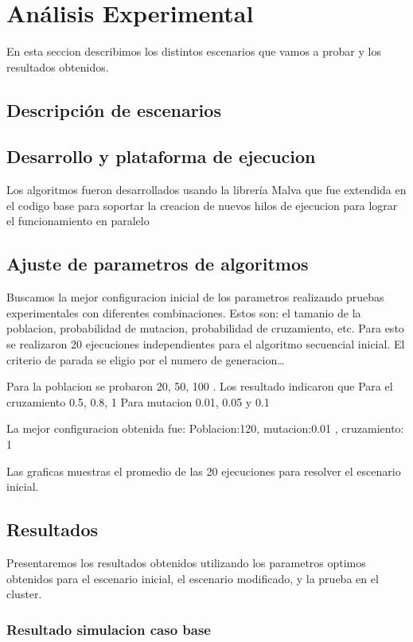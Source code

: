 \chapter{Análisis Experimental}
En esta seccion describimos los distintos escenarios que vamos a probar y los resultados obtenidos.

\section{Descripción de escenarios}


\section{Desarrollo y plataforma de ejecucion }
Los algoritmos fueron desarrollados usando la librería Malva que fue extendida en el codigo base para soportar la creacion de nuevos hilos de ejecucion para lograr el funcionamiento en paralelo

\section{Ajuste de parametros de algoritmos}
Buscamos la mejor configuracion inicial de los parametros realizando pruebas experimentales con diferentes combinaciones.  Estos son: el tamanio de la poblacion,  probabilidad de mutacion, probabilidad de cruzamiento, etc.
Para esto se realizaron 20 ejecuciones independientes para el algoritmo secuencial inicial.
El criterio de parada se eligio por el numero de generacion…

Para la poblacion se probaron 20, 50, 100 . Los resultado indicaron que 
Para el cruzamiento 0.5, 0.8, 1
Para mutacion 0.01, 0.05 y 0.1

La mejor  configuracion obtenida fue:
Poblacion:120, mutacion:0.01 , cruzamiento: 1

Las graficas muestras el promedio de las 20 ejecuciones para resolver el escenario inicial.


\section{Resultados}
Presentaremos los resultados obtenidos  utilizando los parametros optimos obtenidos para el escenario inicial, el escenario modificado, y la prueba en el cluster.

\subsection{Resultado simulacion caso base}
